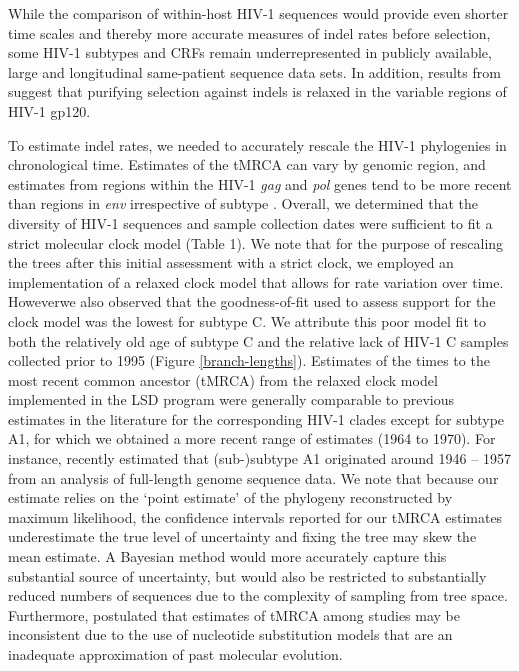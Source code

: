 \documentclass[12pt]{article}
\providecommand{\DIFadd}[1]{{\protect\color{blue}\uwave{#1}}} %
\providecommand{\DIFaddbegin}{} %
\providecommand{\DIFaddend}{} %
\newcommand{\DIFaddincludegraphics}[2][]{{\color{blue}\fbox{\DIFOincludegraphics[#1]{#2}}}} %
\DeclareRobustCommand{\DIFaddbegin}{\DIFOaddbegin \let\includegraphics\DIFaddincludegraphics} %
\DeclareRobustCommand{\DIFaddend}{\DIFOaddend \let\includegraphics\DIFOincludegraphics} %
\begin{document}
While the comparison of within-host HIV-1 sequences would provide even shorter time scales and thereby more accurate measures of indel rates before selection, some HIV-1 subtypes and CRFs remain underrepresented in publicly available, large and longitudinal same-patient sequence data sets.
In addition, results from \citet{wood2009hiv} suggest that purifying selection against indels is relaxed in the variable regions of HIV-1 gp120.



To estimate indel rates, we needed to accurately rescale the HIV-1 phylogenies in chronological time.
Estimates of the tMRCA can vary by genomic region, and estimates from regions within the HIV-1 \textit{gag} and \textit{pol} genes tend to be more recent than regions in \textit{env} irrespective of subtype \citep{olabode2018evidence}.
Overall, we determined that the diversity of HIV-1 sequences and sample collection dates were sufficient to fit a strict molecular clock model (Table 1).
We note that for the purpose of rescaling the trees after this initial assessment with a strict clock, we employed an implementation of a relaxed clock model that allows for rate variation over time.
However\DIFaddbegin \DIFadd{, }\DIFaddend we also observed that the goodness-of-fit used to assess support for the clock model was the lowest for subtype C.
We attribute this poor model fit to both the relatively old age of subtype C \citep{Wertheim:2011} and the relative lack of HIV-1 C samples collected prior to 1995 (Figure \ref{branch-lengths}). 
Estimates of the times to the most recent common ancestor (tMRCA) from the relaxed clock model implemented in the LSD program were generally comparable to previous estimates in the literature for the corresponding HIV-1 clades \citep{Hemelaar:2012, Wertheim:2011} except for subtype A1, for which we obtained a more recent range of estimates (1964 to 1970).
For instance, \citet{tongo2018unravelling} recently estimated that (sub-)subtype A1 originated around 1946 -- 1957 from an analysis of full-length genome sequence data.
We note that because our estimate relies on the `point estimate' of the phylogeny reconstructed by maximum likelihood, the confidence intervals reported for our tMRCA estimates underestimate the true level of uncertainty and fixing the tree may skew the mean estimate.
A Bayesian method would more accurately capture this substantial source of uncertainty, but would also be restricted to substantially reduced numbers of sequences due to the complexity of sampling from tree space.
Furthermore, \citet{Wertheim:2011} postulated that estimates of tMRCA among studies may be inconsistent due to the use of nucleotide substitution models that are an inadequate approximation of past molecular evolution.
\end{document}
